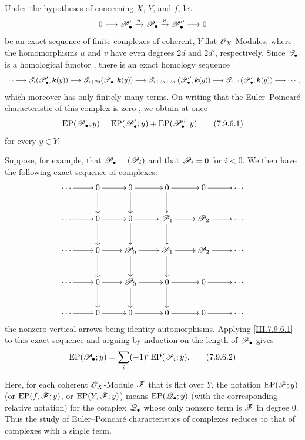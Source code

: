 \begin{env}[7.9.6]
\label{III.7.9.6}
Under the hypotheses of  concerning
$X$, $Y$, and $f$, let
\[
  0\longrightarrow\mathscr{P}'_\bullet
    \xrightarrow{u}\mathscr{P}_\bullet
    \xrightarrow{v}\mathscr{P}''_\bullet
    \longrightarrow 0
\]
be an exact sequence of finite complexes of coherent,
$Y$-flat $\mathscr{O}_X$-Modules, where the homomorphisms $u$
and $v$ have even degrees $2d$ and $2d'$, respectively.
Since $\mathscr{T}_\bullet$ is a homological functor
, there is an exact homology sequence
\[
  \cdots\longrightarrow
  \mathscr{T}_i(\mathscr{P}'_\bullet,\boldsymbol{k}(y))
  \longrightarrow
  \mathscr{T}_{i+2d}(\mathscr{P}_\bullet,\boldsymbol{k}(y))
  \longrightarrow
  \mathscr{T}_{i+2d+2d'}(\mathscr{P}''_\bullet,\boldsymbol{k}(y))
  \longrightarrow
  \mathscr{T}_{i-1}(\mathscr{P}'_\bullet,\boldsymbol{k}(y))
  \longrightarrow\cdots ,
\]
which moreover has only finitely many terms.  On writing
that the Euler--Poincar\'e characteristic of this complex is
zero , we obtain at once
\[
  \operatorname{EP}(\mathscr{P}_\bullet;y)
  =
  \operatorname{EP}(\mathscr{P}'_\bullet;y)
  +
  \operatorname{EP}(\mathscr{P}''_\bullet;y)
  \tag{7.9.6.1}\label{III.7.9.6.1}
\]
for every $y\in Y$.

Suppose, for example, that
$\mathscr{P}_\bullet=(\mathscr{P}_i)$ and that $\mathscr{P}_i=0$ for
$i<0$.  We then have the following exact sequence of
complexes:
\[
\xymatrix@C=2.4em{
  \cdots \ar[r] & 0 \ar[r]\ar[d] & 0 \ar[r]\ar[d]
    & 0 \ar[r]\ar[d] & 0 \ar[r] & \cdots \\
  \cdots \ar[r] & 0 \ar[r]\ar[d] & 0 \ar[r]\ar[d]
    & \sh{P}_1 \ar[r]\ar[d] & \sh{P}_2 \ar[r] & \cdots \\
  \cdots \ar[r] & 0 \ar[r]\ar[d] & \sh{P}_0 \ar[r]\ar[d]
    & \sh{P}_1 \ar[r]\ar[d] & \sh{P}_2 \ar[r] & \cdots \\
  \cdots \ar[r] & 0 \ar[r]\ar[d] & \sh{P}_0 \ar[r]\ar[d]
    & 0 \ar[r]\ar[d] & 0 \ar[r] & \cdots \\
  \cdots \ar[r] & 0 \ar[r] & 0 \ar[r]
    & 0 \ar[r] & 0 \ar[r] & \cdots
}
\]
the nonzero vertical arrows being identity automorphisms.
Applying \eqref{III.7.9.6.1} to this exact sequence and
arguing by induction on the length of $\mathscr{P}_\bullet$
gives
\[
  \operatorname{EP}(\mathscr{P}_\bullet;y)
  =
  \sum_i(-1)^i\operatorname{EP}(\mathscr{P}_i;y).
  \tag{7.9.6.2}\label{III.7.9.6.2}
\]

Here, for each coherent $\mathscr{O}_X$-Module $\mathscr{F}$ that is
flat over $Y$, the notation
$\operatorname{EP}(\mathscr{F};y)$ (or
$\operatorname{EP}(f,\mathscr{F};y)$, or
$\operatorname{EP}(Y,\mathscr{F};y)$) means
$\operatorname{EP}(\mathscr{Q}_\bullet;y)$ (with the
corresponding relative notation) for the complex
$\mathscr{Q}_\bullet$ whose only nonzero term is $\mathscr{F}$ in
degree $0$.  Thus the study of Euler--Poincar\'e
characteristics of complexes reduces to that of complexes
with a single term.
\end{env}

